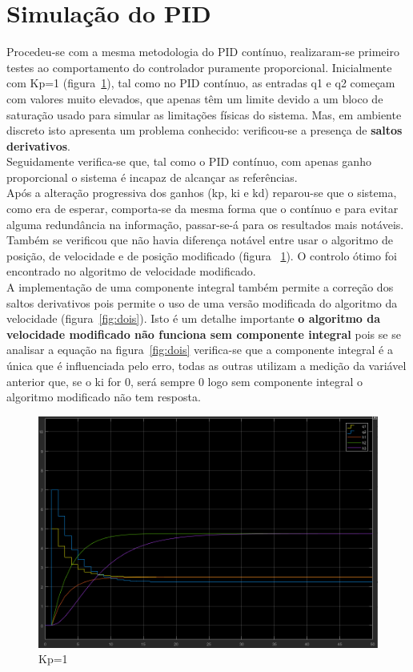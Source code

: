 \documentclass[11pt]{article}
\begin{document}
\section{Simulação do PID}
Procedeu-se com a mesma metodologia do PID contínuo,  realizaram-se primeiro testes ao comportamento do controlador puramente proporcional. Inicialmente com Kp=1 (figura~\ref{fig:um}), tal como no PID contínuo, as entradas q1 e q2 começam com valores muito elevados, que apenas têm um limite devido a um bloco de saturação usado para simular as limitações físicas do sistema. Mas, em ambiente discreto isto apresenta um problema conhecido: verificou-se a presença de  \textbf{saltos derivativos}. \\ 
Seguidamente verifica-se que, tal como o PID contínuo, com apenas ganho proporcional o sistema é incapaz de alcançar as referências.\\ Após a alteração progressiva dos ganhos (kp, ki e kd) reparou-se que o sistema, como era de esperar, comporta-se da mesma forma que o contínuo e para evitar alguma redundância na informação, passar-se-á para os resultados mais notáveis.\\ Também se verificou que não havia diferença notável entre usar o algoritmo de posição, de velocidade e de posição modificado (figura ~\ref{}). O controlo ótimo foi encontrado no algoritmo de velocidade modificado.\\
A implementação de uma componente integral também permite a correção dos saltos derivativos pois permite o uso de uma versão modificada do algoritmo da velocidade (figura~\ref{fig:dois}). Isto é um detalhe importante \textbf{o algoritmo da velocidade modificado não funciona sem componente integral} pois se se analisar a equação na figura~\ref{fig:dois} verifica-se que a componente integral é a única que é influenciada pelo erro, todas as outras utilizam a medição da variável anterior que, se o ki for 0, será sempre 0 logo sem componente integral o algoritmo modificado não tem resposta.
\begin{figure}[!htbp]
	\centering
      		 \includegraphics[page=1,width=1\textwidth]{img/puramenteP.png} 
		\caption{Kp=1}	
		\label{fig:um}
\end{figure}
\end{document}
